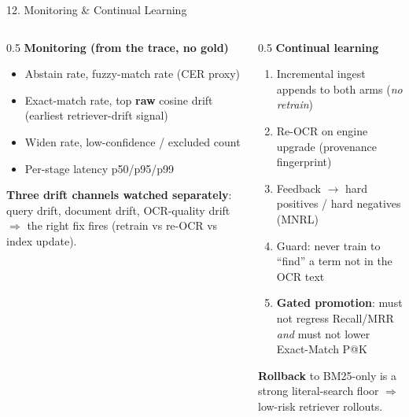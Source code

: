 \documentclass[10pt,aspectratio=169]{beamer}
\begin{document}
\begin{frame}{12. Monitoring \& Continual Learning}
\begin{columns}[T]
\begin{column}{0.5\textwidth}
\textbf{Monitoring (from the trace, no gold)}
\begin{itemize}\small
  \item Abstain rate, fuzzy-match rate (CER proxy)
  \item Exact-match rate, top \textbf{raw} cosine drift (earliest retriever-drift signal)
  \item Widen rate, low-confidence / excluded count
  \item Per-stage latency p50/p95/p99
\end{itemize}
\textbf{Three drift channels watched separately}: query drift, document drift, OCR-quality drift $\Rightarrow$ the right fix fires (retrain vs re-OCR vs index update).
\end{column}
\begin{column}{0.5\textwidth}
\textbf{Continual learning}
\begin{enumerate}\small
  \item Incremental ingest appends to both arms (\emph{no retrain})
  \item Re-OCR on engine upgrade (provenance fingerprint)
  \item Feedback $\to$ hard positives / hard negatives (MNRL)
  \item Guard: never train to ``find'' a term not in the OCR text
  \item \textbf{Gated promotion}: must not regress Recall/MRR \emph{and} must not lower Exact-Match P@K
\end{enumerate}
\textbf{Rollback} to BM25-only is a strong literal-search floor $\Rightarrow$ low-risk retriever rollouts.
\end{column}
\end{columns}
\end{frame}
\end{document}
